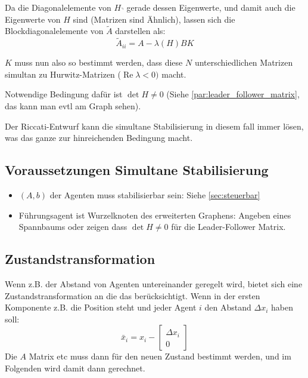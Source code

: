 Da die Diagonalelemente von $H_\urcorner$ gerade dessen Eigenwerte, und damit auch die
Eigenwerte von $H$ sind (Matrizen sind Ähnlich), lassen sich die Blockdiagonalelemente von
$\tilde{A}$ darstellen als:
\begin{equation}
    \tilde{A}_{ii} = A-\lambda(H)BK
\end{equation}

$K$ muss nun also so bestimmt werden, dass diese $N$ unterschiedlichen Matrizen simultan
zu Hurwitz-Matrizen ($\operatorname{Re}\lambda < 0)$ macht.

Notwendige Bedingung dafür ist $\det H \neq 0$ (Siehe \ref{par:leader_follower_matrix},
das kann man evtl am Graph sehen).

Der Riccati-Entwurf kann die simultane Stabilisierung in diesem fall immer lösen,
was das ganze zur hinreichenden Bedingung macht.

\subsection{Voraussetzungen Simultane Stabilisierung}
\begin{itemize}
    \item $(A,b)$ der Agenten muss stabilisierbar sein: Siehe \ref{sec:steuerbar}
    \item Führungsagent ist Wurzelknoten des erweiterten Graphens:
          Angeben eines Spannbaums oder zeigen dass $\det H \neq 0$
          für die Leader-Follower Matrix.
\end{itemize}

\subsection{Zustandstransformation}
Wenn z.B. der Abstand von Agenten untereinander geregelt wird, bietet sich eine
Zustandstransformation an die das berücksichtigt. Wenn in der ersten Komponente
z.B. die Position steht und jeder Agent $i$ den Abstand $\Delta x_i$ haben soll:
\begin{equation}
    \bar{x}_i = x_i - \begin{bmatrix}
        \Delta x_i \\ 0
    \end{bmatrix}
\end{equation}
Die $A$ Matrix etc muss dann für den neuen Zustand bestimmt werden, und im Folgenden
wird damit dann gerechnet.


